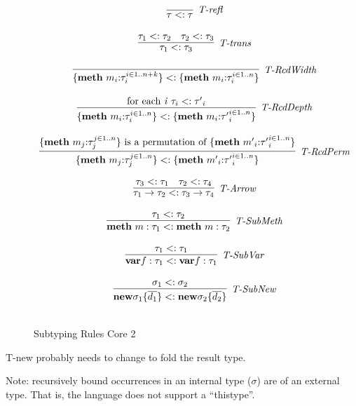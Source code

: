 \begin{figure}
\centering
\[
\begin{array}{c}
\infer[\textit{T-refl}]
	{\tau<:\tau}
	{} \\[3ex]

\infer[\textit{T-trans}]
	{\tau_1<:\tau_3}
	{\tau_1<:\tau_2 & \tau_2<:\tau_3} \\[3ex]	

\infer[\textit{T-RcdWidth}]
	{\{ \keyw{meth}~m_i{:}\tau_i ^{i \in 1..n+k} \} <: \{\keyw{meth}~m_i{:}\tau_i ^{i \in 1..n} \}}
	{}\\[3ex]

\infer[\textit{T-RcdDepth}]
	{\{ \keyw{meth}~m_i{:}\tau_i ^{i \in 1..n} \} <: \{ \keyw{meth}~m_i{:}{\tau'}_i ^{i \in 1..n} \}}
	{\textrm{for each \textit{i}} ~ \tau_i <: {\tau'}_i}\\[3ex]

\infer[\textit{T-RcdPerm}]
	{\{ \keyw{meth}~m_j{:}\tau_j ^{j \in 1..n} \} <: \{ \keyw{meth}~{m'}_i{:}{\tau'}_i ^{i \in 1..n} \}}
	{\{ \keyw{meth}~m_j{:}\tau_j ^{j \in 1..n} \} \textrm{ is a permutation of } \{ \keyw{meth}~{m'}_i{:}{\tau'}_i ^{i \in 1..n} \}}\\[3ex]

\infer[\textit{T-Arrow}]
	{\tau_1 \rightarrow \tau_2 <: \tau_3 \rightarrow \tau_4}
	{\tau_3 <: \tau_1 & \tau_2 <: \tau_4}\\[3ex]

\infer[\textit{T-SubMeth}]
	{\keyw{meth}~m:\tau_1 <: \keyw{meth}~ m:\tau_2}
	{\tau_1 <: \tau_2}\\[3ex]

\infer[\textit{T-SubVar}]
	{\keyw{var} f:\tau_1 <: \keyw{var} f:\tau_1}
	{\tau_1 <: \tau_1}\\[3ex]

\infer[\textit{T-SubNew}]
	{\keyw{new} \sigma_1\{\overline{d_1}\} <: \keyw{new} \sigma_2\{\overline{d_2}\}}
	{\sigma_1 <: \sigma_2}\\[3ex]

\end{array}
\]
\caption{Subtyping Rules Core 2}
\end{figure}





T-new probably needs to change to fold the result type.


Note: recursively bound occurrences in an internal type ($\sigma$) are of an external type.  That is, the language does not support a ``thistype''.


